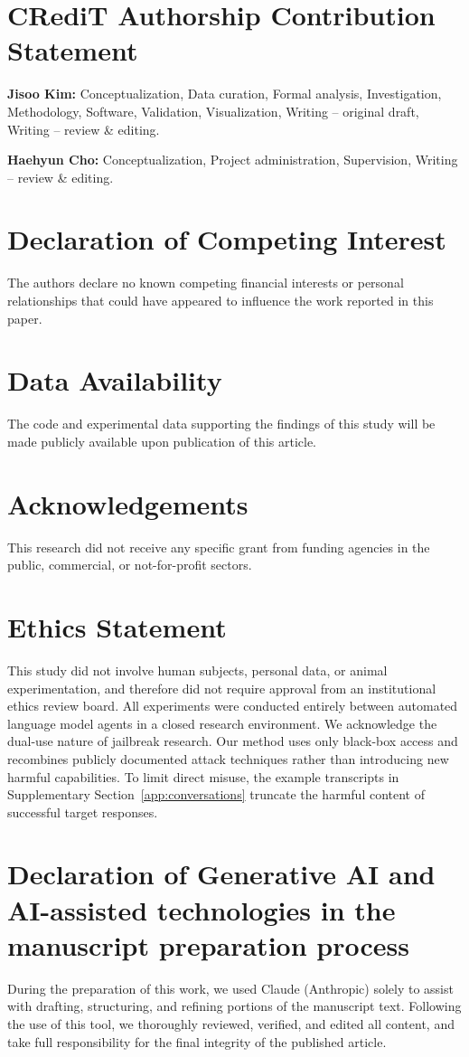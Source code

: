 \section*{CRediT Authorship Contribution Statement}
\textbf{Jisoo Kim:} Conceptualization, Data curation, Formal analysis, Investigation, Methodology, Software, Validation, Visualization, Writing -- original draft, Writing -- review \& editing.

\noindent\textbf{Haehyun Cho:} Conceptualization, Project administration, Supervision, Writing -- review \& editing.

\section*{Declaration of Competing Interest}
The authors declare no known competing financial interests or personal relationships that could have appeared to influence the work reported in this paper.

\section*{Data Availability}
The code and experimental data supporting the findings of this study will be made publicly available upon publication of this article.

\section*{Acknowledgements}
This research did not receive any specific grant from funding agencies in the public, commercial, or not-for-profit sectors.

\section*{Ethics Statement}
This study did not involve human subjects, personal data, or animal experimentation, and therefore did not require approval from an institutional ethics review board.
All experiments were conducted entirely between automated language model agents in a closed research environment.
We acknowledge the dual-use nature of jailbreak research. Our method uses only black-box access and recombines publicly documented attack techniques rather than introducing new harmful capabilities. To limit direct misuse, the example transcripts in Supplementary Section~\ref{app:conversations} truncate the harmful content of successful target responses.

\section*{Declaration of Generative AI and AI-assisted technologies in the manuscript preparation process}
During the preparation of this work, we used Claude (Anthropic) solely to assist with drafting, structuring, and refining portions of the manuscript text.
Following the use of this tool, we thoroughly reviewed, verified, and edited all content, and take full responsibility for the final integrity of the published article.
